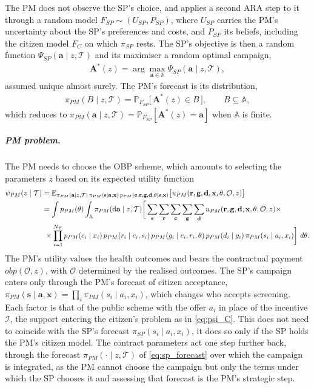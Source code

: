 \documentclass[12pt]{article}
\begin{document}
The PM does not observe the SP's choice, and applies a second ARA step to it
through a random model $F_{SP} \sim (U_{SP}, P_{SP})$, where $U_{SP}$ carries
the PM's uncertainty about the SP's preferences and costs, and $P_{SP}$ its
beliefs, including the citizen model $F_C$ on which $\pi_{SP}$ rests. The SP's
objective is then a random function $\Psi_{SP}(\mathbf{a} \mid z, \mathcal{T})$
and its maximiser a random optimal campaign,
\begin{align}
  \mathbf{A}^{*}(z) = \arg\max_{\mathbf{a} \in \mathbb{A}}
    \Psi_{SP}(\mathbf{a} \mid z, \mathcal{T}),
\end{align}
assumed unique almost surely. The PM's forecast is its distribution,
\begin{align} \label{eq:sp_forecast}
    \pi_{PM}(B \mid z, \mathcal{T})
    = \mathbb{P}_{F_{SP}}\big[\, \mathbf{A}^{*}(z) \in B \,\big],
    \qquad B \subseteq \mathbb{A},
\end{align}
which reduces to
$\pi_{PM}(\mathbf{a} \mid z, \mathcal{T}) =
\mathbb{P}_{F_{SP}}[\mathbf{A}^{*}(z) = \mathbf{a}]$ when $\mathbb{A}$ is
finite.


\subparagraph{PM problem.}
The PM needs to choose the OBP scheme, which amounts to selecting the parameters $z$ based on its expected utility function
\begin{align}\label{eq:pm_util}
    \psi_{PM}(z \mid \mathcal{T}) &= \mathbb{E}_{\pi_{PM}(\mathbf{a} \mid z, \mathcal{T})\, \pi_{PM}(\mathbf{s} \mid \mathbf{a}, \mathbf{x})\, p_{PM}(\mathbf{c}, \mathbf{r}, \mathbf{g}, \mathbf{d}, \theta \mid \mathbf{s}, \mathbf{x})} \big[ u_{PM}( \mathbf{r}, \mathbf{g}, \mathbf{d}, \mathbf{x}, \theta, \mathcal{O}, z) \big] \\
    &  = \int p_{PM}(\theta) \int_{\mathbb{A}} \pi_{PM}(\mathrm{d}\mathbf{a} \mid z, \mathcal{T}) \bigg[ \sum_{\mathbf{s}} \sum_{\mathbf{r}} \sum_{\mathbf{c}} \sum_{\mathbf{g}} \sum_{\mathbf{d}}
     u_{PM}( \mathbf{r}, \mathbf{g}, \mathbf{d}, \mathbf{x}, \theta, \mathcal{O}, z) \times \nonumber \\
    & \ \times \prod_{i=1}^{N_{\mathcal{T}}} p_{PM}(c_i \mid x_i)\, p_{PM}(r_i \mid c_i, s_i)\, p_{PM}(g_i \mid c_i, r_i, \theta)\, p_{PM}(d_i \mid g_i)\, \pi_{PM}(s_i \mid a_i, x_i) \bigg]\,  \, d\theta. \notag
\end{align}
The PM's utility values the health outcomes and bears the contractual payment $obp(\mathcal{O}, z)$, with $\mathcal{O}$ determined by the realised outcomes. The SP's campaign enters only through the PM's forecast of citizen acceptance, $\pi_{PM}(\mathbf{s} \mid \mathbf{a}, \mathbf{x}) = \prod_i \pi_{PM}(s_i \mid a_i, x_i)$, which changes who accepts screening. Each factor is that of the public scheme with the offer $a_i$ in place of the incentive $\mathcal{I}$, the support entering the citizen's problem as in \eqref{eq:psi_C}. This does not need to coincide with the SP's forecast $\pi_{SP}(s_i \mid a_i, x_i)$, it does so only if the SP holds the PM's citizen model. The contract parameters act one step further back, through the forecast $\pi_{PM}(\cdot \mid z, \mathcal{T})$ of \eqref{eq:sp_forecast} over which the campaign is integrated, as the PM cannot choose the campaign but only the terms under which the SP chooses it and assessing that forecast is the PM's strategic step.
\end{document}
